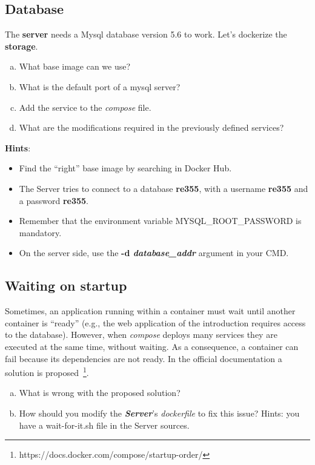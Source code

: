 \documentclass[a4paper,11pt]{exam}
\begin{document}
\subsection{Database}
	\begin{questions}
		\question The \textbf{server} needs a Mysql database version 5.6 to work. Let's dockerize the \textbf{storage}.
	
	\begin{enumerate}[(a)] %
		\item What base image can we use?
		\item What is the default port of a mysql server?
		\item Add the service to the \textit{compose} file.
		\item What are the modifications required in the previously defined services?
	\end{enumerate}
		\textbf{Hints}:
	\begin{itemize}
		\item Find the ``right'' base image by searching in Docker Hub.

		\item The Server tries to connect to a database \textbf{re355}, with a username \textbf{re355} and a password \textbf{re355}.

		\item Remember that the environment variable MYSQL\_ROOT\_PASSWORD is mandatory.

		\item On the server side, use the \textbf{-d \textit{database\_addr}} argument in your CMD.

	\end{itemize}
	\end{questions}
	
\subsection{Waiting on startup}	
	\begin{questions}

	\question Sometimes, an application running within a container must wait until another container is ``ready'' (e.g., the web application of the introduction requires access to the database). However, when \textit{compose} deploys many services they are executed at the same time, without waiting. As a consequence, a container can fail because its dependencies are not ready. In the official documentation a solution is proposed~\footnote{https://docs.docker.com/compose/startup-order/}.
	
		\begin{enumerate}[(a)] %
			\item What is wrong with the proposed solution?
			\item How should you modify the \textit{\textbf{Server}}'s \textit{dockerfile} to fix this issue? Hints: you have a wait-for-it.sh file in the Server sources.
		\end{enumerate}
	\end{questions}
\end{document}
